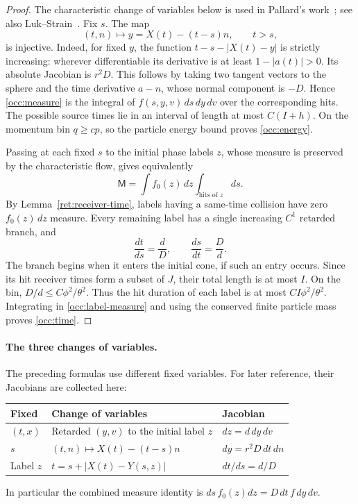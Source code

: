 \begin{proof}
The characteristic change of variables below is used in
Pallard's work~\cite[Lemma~2.1]{Pallard2005}; see also
Luk--Strain~\cite[Proof of Proposition~5.2]{LukStrain2014Continuation}.
Fix $s$. The map
\[
 (t,n)\longmapsto y=X(t)-(t-s)n,\qquad t>s,
\]
is injective. Indeed, for fixed $y$, the function
$t-s-|X(t)-y|$ is strictly increasing: wherever differentiable its
derivative is at least $1-|a(t)|>0$. Its absolute Jacobian is $r^2D$.
This follows by taking two tangent vectors to the sphere and the time
derivative $a-n$, whose normal component is $-D$.
Hence \eqref{occ:measure} is the integral of $f(s,y,v)\,ds\,dy\,dv$
over the corresponding hits. The possible source times lie in an
interval of length at most $C(I+h)$. On the momentum bin $q\geq cp$,
so the particle energy bound proves \eqref{occ:energy}.

Passing at each fixed $s$ to the initial phase labels $z$, whose measure
is preserved by the characteristic flow, gives equivalently
\begin{equation}\label{occ:label-measure}
 \mathsf M=\int f_0(z)\,dz\int_{\text{hits of }z}ds.
\end{equation}
By Lemma~\ref{ret:receiver-time}, labels having a same-time collision
have zero $f_0(z)\,dz$ measure. Every remaining label has a single
increasing $C^1$ retarded branch, and
\begin{equation}\label{occ:retarded-derivative}
 \frac{dt}{ds}=\frac dD,\qquad \frac{ds}{dt}=\frac Dd.
\end{equation}
The branch begins when it enters the initial cone, if such an entry
occurs. Since its hit receiver times form a subset of $J$, their total
length is at most $I$. On the bin, $D/d\leq C\phi^2/\theta^2$.
Thus the hit duration of each label is at most
$CI\phi^2/\theta^2$. Integrating in \eqref{occ:label-measure} and using
the conserved finite particle mass proves \eqref{occ:time}.
\end{proof}

\paragraph{The three changes of variables.}
The preceding formulas use different fixed variables. For later reference,
their Jacobians are collected here:
\begin{center}
\renewcommand{\arraystretch}{1.4}
\begin{tabular}{@{}p{.15\linewidth}p{.47\linewidth}p{.30\linewidth}@{}}
\toprule
Fixed & Change of variables & Jacobian \\
\midrule
$(t,x)$ & Retarded $(y,v)$ to the initial label $z$
 & $dz=d\,dy\,dv$ \\
$s$ & $(t,n)\mapsto X(t)-(t-s)n$
 & $dy=r^2D\,dt\,dn$ \\
Label $z$ & $t=s+|X(t)-Y(s,z)|$
 & $dt/ds=d/D$ \\
\bottomrule
\end{tabular}
\end{center}
In particular the combined measure identity is
$ds\,f_0(z)dz=D\,dt\,f\,dy\,dv$.

